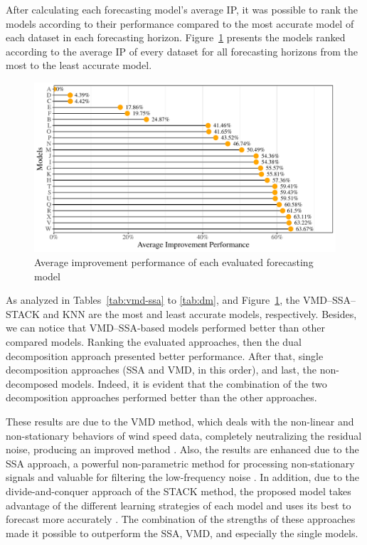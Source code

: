 After calculating each forecasting model's average \ac{IP}, it was possible to rank the models according to their performance compared to the most accurate model of each dataset in each forecasting horizon. Figure~\ref{fig:ip} presents the models ranked according to the average \ac{IP} of every dataset for all forecasting horizons from the most to the least accurate model.

\begin{figure}[htb!]
    \centering
    \includegraphics[width=.9\linewidth]{Media/cs3_avr_ip.pdf}
    \caption{Average improvement performance of each evaluated forecasting model}
    \label{fig:ip}
\end{figure}

As analyzed in Tables~\ref{tab:vmd-ssa} to \ref{tab:dm}, and Figure~\ref{fig:ip}, the \ac{VMD}--\ac{SSA}--\ac{STACK} and \ac{KNN} are the most and least accurate models, respectively. Besides, we can notice that \ac{VMD}--\ac{SSA}-based models performed better than other compared models. Ranking the evaluated approaches, then the dual decomposition approach presented better performance. After that, single decomposition approaches (\ac{SSA} and \ac{VMD}, in this order), and last, the non-decomposed models. Indeed, it is evident that the combination of the two decomposition approaches performed better than the other approaches.

These results are due to the \ac{VMD} method, which deals with the non-linear and non-stationary behaviors of wind speed data, completely neutralizing the residual noise, producing an improved method \cite{dasilva2020Forecasting}. Also, the results are enhanced due to the \ac{SSA} approach, a powerful non-parametric method for processing non-stationary signals and valuable for filtering the low-frequency noise \cite{moreno2020Multistep}. In addition, due to the divide-and-conquer approach of the \ac{STACK} method, the proposed model takes advantage of the different learning strategies of each model and uses its best to forecast more accurately \cite{dasilva2020Multistep}. The combination of the strengths of these approaches made it possible to outperform the \ac{SSA}, \ac{VMD}, and especially the single models.

